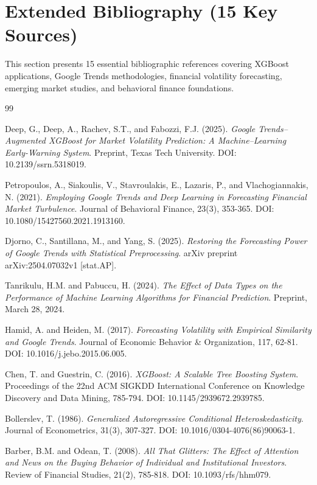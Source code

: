\documentclass[12pt,a4paper]{article}
\begin{document}
\newpage
\section{Extended Bibliography (15 Key Sources)}

This section presents 15 essential bibliographic references covering XGBoost applications, Google Trends methodologies, financial volatility forecasting, emerging market studies, and behavioral finance foundations.


\begin{thebibliography}{99}

Deep, G., Deep, A., Rachev, S.T., and Fabozzi, F.J. (2025).
\textit{Google Trends–Augmented XGBoost for Market Volatility Prediction: A Machine–Learning Early-Warning System}.
Preprint, Texas Tech University.
DOI: 10.2139/ssrn.5318019.

Petropoulos, A., Siakoulis, V., Stavroulakis, E., Lazaris, P., and Vlachogiannakis, N. (2021).
\textit{Employing Google Trends and Deep Learning in Forecasting Financial Market Turbulence}.
Journal of Behavioral Finance, 23(3), 353-365.
DOI: 10.1080/15427560.2021.1913160.

Djorno, C., Santillana, M., and Yang, S. (2025).
\textit{Restoring the Forecasting Power of Google Trends with Statistical Preprocessing}.
arXiv preprint arXiv:2504.07032v1 [stat.AP].

Tanrikulu, H.M. and Pabuccu, H. (2024).
\textit{The Effect of Data Types on the Performance of Machine Learning Algorithms for Financial Prediction}.
Preprint, March 28, 2024.

Hamid, A. and Heiden, M. (2017).
\textit{Forecasting Volatility with Empirical Similarity and Google Trends}.
Journal of Economic Behavior \& Organization, 117, 62-81.
DOI: 10.1016/j.jebo.2015.06.005.

Chen, T. and Guestrin, C. (2016).
\textit{XGBoost: A Scalable Tree Boosting System}.
Proceedings of the 22nd ACM SIGKDD International Conference on Knowledge Discovery and Data Mining, 785-794.
DOI: 10.1145/2939672.2939785.

Bollerslev, T. (1986).
\textit{Generalized Autoregressive Conditional Heteroskedasticity}.
Journal of Econometrics, 31(3), 307-327.
DOI: 10.1016/0304-4076(86)90063-1.

Barber, B.M. and Odean, T. (2008).
\textit{All That Glitters: The Effect of Attention and News on the Buying Behavior of Individual and Institutional Investors}.
Review of Financial Studies, 21(2), 785-818.
DOI: 10.1093/rfs/hhm079.


\end{thebibliography}
\end{document}
